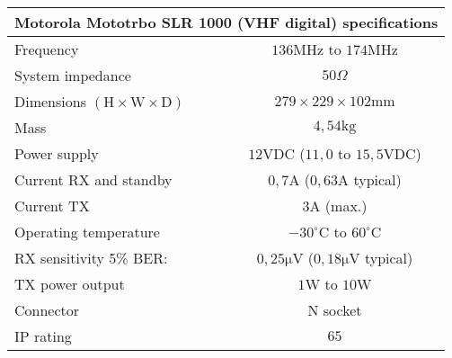 \footnotesize
\begin{tabular}{|l|c|}
	\hline
	\multicolumn{2}{|c|}{\textbf{Motorola Mototrbo SLR 1000 (VHF digital) specifications}} \\
	\hline
 	Frequency & $136\mathrm{MHz}$ to $174\mathrm{MHz}$ \\
	System impedance & $50\Omega$\\
 	Dimensions $\mathrm{(H \times W \times D)}$ & $279 \times 229 \times 102 \mathrm{mm}$ \\%
 	Mass & $4,54\mathrm{kg}$ \\%
	Power supply & $12\mathrm{VDC}$ ($11,0$ to $15,5\mathrm{VDC}$) \\
	Current RX and standby & $0,7\mathrm{A}$ ($0,63\mathrm{A}$ typical) \\
	Current TX & $3\mathrm{A}$ (max.) \\
	Operating temperature & $-30^\circ \mathrm{C}$ to $60^\circ \mathrm{C}$ \\
	RX sensitivity 5\% BER: & $0,25\mathrm{\mu V}$ ($0,18\mathrm{\mu V}$ typical) \\
	TX power output & $1\mathrm{W}$ to $10\mathrm{W}$ \\
	Connector & N socket\\
	IP rating & $65$\\
	\hline
\end{tabular}